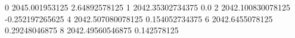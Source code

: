 0 2045.001953125 2.64892578125
1 2042.35302734375 0.0
2 2042.100830078125 -0.252197265625
4 2042.507080078125 0.154052734375
6 2042.6455078125 0.29248046875
8 2042.49560546875 0.142578125

